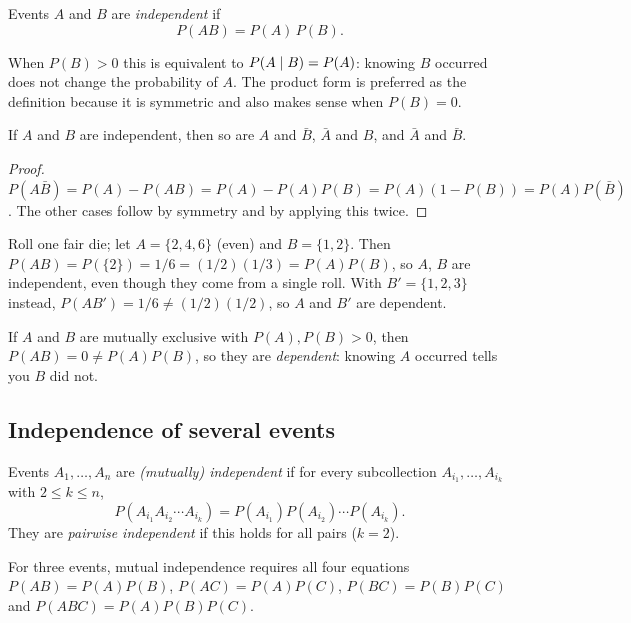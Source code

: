 \begin{definition}
Events $A$ and $B$ are \emph{independent} if
\[
  P(AB) = P(A)\,P(B).
\]
\end{definition}

When $P(B)>0$ this is equivalent to $P(A\mid B) = P(A)$: knowing $B$ occurred does not
change the probability of $A$. The product form is preferred as the definition because it
is symmetric and also makes sense when $P(B)=0$.

\begin{theorem}
If $A$ and $B$ are independent, then so are $A$ and $\bar B$, $\bar A$ and $B$, and
$\bar A$ and $\bar B$.
\end{theorem}

\begin{proof}
$P(A\bar B) = P(A) - P(AB) = P(A) - P(A)P(B) = P(A)(1 - P(B)) = P(A)P(\bar B)$. The other
cases follow by symmetry and by applying this twice.
\end{proof}

\begin{example}
Roll one fair die; let $A = \{2,4,6\}$ (even) and $B = \{1,2\}$. Then
$P(AB) = P(\{2\}) = 1/6 = (1/2)(1/3) = P(A)P(B)$, so $A$, $B$ are independent, even
though they come from a single roll. With $B' = \{1,2,3\}$ instead,
$P(AB') = 1/6 \ne (1/2)(1/2)$, so $A$ and $B'$ are dependent.
\end{example}

\begin{important}
If $A$ and $B$ are mutually exclusive with $P(A), P(B) > 0$, then $P(AB) = 0 \ne
P(A)P(B)$, so they are \emph{dependent}: knowing $A$ occurred tells you $B$ did not.
\end{important}

\subsection{Independence of several events}

\begin{definition}
Events $A_1,\dots,A_n$ are \emph{(mutually) independent} if for every subcollection
$A_{i_1},\dots,A_{i_k}$ with $2 \le k \le n$,
\[
  P(A_{i_1}A_{i_2}\cdots A_{i_k}) = P(A_{i_1})P(A_{i_2})\cdots P(A_{i_k}).
\]
They are \emph{pairwise independent} if this holds for all pairs ($k=2$).
\end{definition}

For three events, mutual independence requires all four equations
$P(AB) = P(A)P(B)$, $P(AC) = P(A)P(C)$, $P(BC) = P(B)P(C)$ and
$P(ABC) = P(A)P(B)P(C)$.


